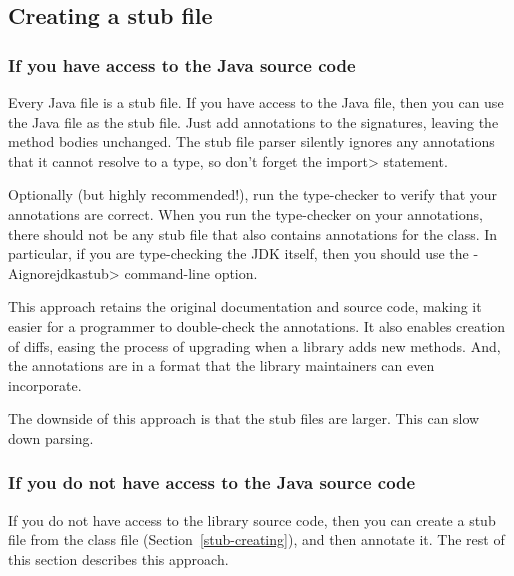


\subsection{Creating a stub file\label{stub-creating}}


\subsubsection{If you have access to the Java source code\label{stub-creating-with-source}}

Every Java file is a stub file.  If you have access to the Java file, then
you can use the Java file as the stub file.  Just add
annotations to the signatures, leaving the method bodies unchanged.
The stub file parser silently ignores any annotations that it cannot
resolve to a type, so don't forget the \<import> statement.

Optionally (but highly recommended!), run the type-checker to verify that
your annotations are correct.  When you run the type-checker on your
annotations, there should not be any stub file that also contains
annotations for the class.  In particular, if you are type-checking the JDK
itself, then you should use the \<-Aignorejdkastub> command-line option.

This approach retains the original
documentation and source code, making it easier for a programmer to
double-check the annotations.  It also enables creation of diffs, easing
the process of upgrading when a library adds new methods.  And, the
annotations are in a format that the library maintainers can even
incorporate.

The downside of this approach is that the stub files are larger.  This can
slow down parsing.


\subsubsection{If you do not have access to the Java source code\label{stub-creating-without-source}}

If you do not have access to the library source code, then you can create a
stub file from the class file (Section~\ref{stub-creating}),
and then annotate it.  The rest of this section describes this approach.


